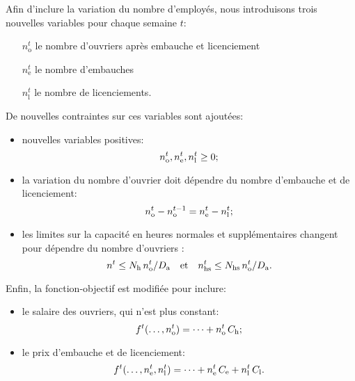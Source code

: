 Afin d'inclure la variation du nombre d'employés, nous introduisons trois nouvelles variables pour chaque semaine $t$:

\begin{itemize}[before={\renewcommand\makelabel[1]{\makebox[1cm][r]{##1\hspace{.2cm}}}}]
    \item[$n_\mathrm{o}^t$] le nombre d'ouvriers après embauche et licenciement
    \item[$n_\mathrm{e}^t$] le nombre d'embauches
    \item[$n_\mathrm{l}^t$] le nombre de licenciements.
\end{itemize}

De nouvelles contraintes sur ces variables sont ajoutées:

\begin{itemize}
    \item nouvelles variables positives:
    \[
        n_\mathrm{o}^t, n_\mathrm{e}^t, n_\mathrm{l}^t \geq 0
        \text;
    \]
    
    \item la variation du nombre d'ouvrier doit dépendre du nombre d'embauche et de licenciement:
    \[
        n_\mathrm{o}^t - n_\mathrm{o}^{t-1} = n_\mathrm{e}^t - n_\mathrm{l}^t
        \text;
    \]
    
    \item les limites sur la capacité en heures normales et supplémentaires changent pour dépendre du nombre d'ouvriers :
    \[
        n^t \leq N_\mathrm{h}\,n_\mathrm{o}^t/D_\mathrm{a}
        \quad\mathrm{et}\quad
        n_\mathrm{hs}^t \leq N_\mathrm{hs}\,n_\mathrm{o}^t/D_\mathrm{a}
        \text.
    \]
\end{itemize}

Enfin, la fonction-objectif est modifiée pour inclure:

\begin{itemize}
    \item le salaire des ouvriers, qui n'est plus constant:
    \[
        f^t(\dots,n_\mathrm{o}^t)
        = \dots + n_\mathrm{o}^t\,C_\mathrm{h}
        \text;
    \]
    
    \item le prix d'embauche et de licenciement:
    \[
        f^t(\dots,n_\mathrm{e}^t,n_\mathrm{l}^t)
        = \dots + n_\mathrm{e}^t\,C_\mathrm{e} + n_\mathrm{l}^t\,C_\mathrm{l}
        \text.
    \]
\end{itemize}

